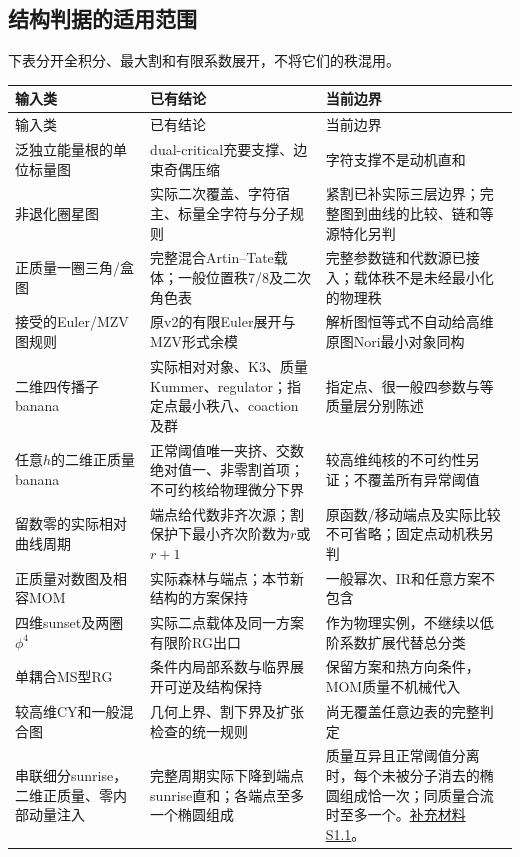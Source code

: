 \documentclass[11pt,a4paper,oneside]{ctexart}
\theoremstyle{cnplain}
\theoremstyle{definition}
\theoremstyle{remark}
\numberwithin{equation}{section}
\newcommand{\otherref}[2]{\href{#1.pdf}{#2}}
\begin{document}
\subsection{结构判据的适用范围}
下表分开全积分、最大割和有限系数展开，不将它们的秩混用。
\begin{center}\small
\begin{longtable}{>{\raggedright\arraybackslash}p{29mm}>{\raggedright\arraybackslash}p{51mm}>{\raggedright\arraybackslash}p{61mm}}
\toprule 输入类&已有结论&当前边界\\\midrule\endfirsthead
\toprule 输入类&已有结论&当前边界\\\midrule\endhead
泛独立能量根的单位标量图&
dual-critical充要支撑、边束奇偶压缩&
字符支撑不是动机直和\\
非退化圈星图&
实际二次覆盖、字符宿主、标量全字符与分子规则&
紧割已补实际三层边界；完整图到曲线的比较、链和等源特化另判\\
正质量一圈三角/盒图&
完整混合Artin--Tate载体；一般位置秩7/8及二次角色表&
完整参数链和代数源已接入；载体秩不是未经最小化的物理秩\\
接受的Euler/MZV图规则&
原v2的有限Euler展开与MZV形式余模&
解析图恒等式不自动给高维原图Nori最小对象同构\\
二维四传播子banana&
实际相对对象、K3、质量Kummer、regulator；指定点最小秩八、coaction及群&
指定点、很一般四参数与等质量层分别陈述\\
任意$h$的二维正质量banana&
正常阈值唯一夹挤、交数绝对值一、非零割首项；不可约核给物理微分下界&
较高维纯核的不可约性另证；不覆盖所有异常阈值\\
留数零的实际相对曲线周期&
端点给代数非齐次源；割保护下最小齐次阶数为$r$或$r+1$&
原函数/移动端点及实际比较不可省略；固定点动机秩另判\\
正质量对数图及相容MOM&
实际森林与端点；本节新结构的方案保持&
一般幂次、IR和任意方案不包含\\
四维sunset及两圈$\phi^4$&
实际二点载体及同一方案有限阶RG出口&
作为物理实例，不继续以低阶系数扩展代替总分类\\
单耦合MS型RG&
条件内局部系数与临界展开可逆及结构保持&
保留方案和热方向条件，MOM质量不机械代入\\
较高维CY和一般混合图&
几何上界、割下界及扩张检查的统一规则&
尚无覆盖任意边表的完整判定\\
串联细分sunrise，二维正质量、零内部动量注入 &
完整周期实际下降到端点sunrise直和；各端点至多一个椭圆组成 &
质量互异且正常阈值分离时，每个未被分子消去的椭圆组成恰一次；同质量合流时至多一个。\otherref{feynman_periods_supplement}{补充材料S1.1}。\\

\end{longtable}
\end{center}
\end{document}
